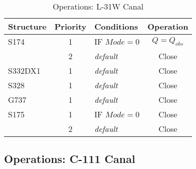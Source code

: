 \scriptsize
\begin{table}[!h]
\centering
\caption{Operations: L-31W Canal}
\label{tab:M11opsL31W}
\begin{tabular}{|l|c|l|c|c|}
\hline
\textbf{Structure} & \textbf{Priority}  & \textbf{Conditions} & \multicolumn{2}{|c|}{\textbf{Operation}}   \\
\hline
\hline
S174          &  1  & IF $Mode=0$                   & \multicolumn{2}{|c|}{$Q = Q_{obs}$}   \\
\hline
              &  2  & \it{default}                  & \multicolumn{2}{|c|}{Close}           \\
\hline
\hline
S332DX1       &  1  & \it{default}                  & \multicolumn{2}{|c|}{Close}           \\
\hline
\hline
S328          &  1  & \it{default}                  & \multicolumn{2}{|c|}{Close}           \\
\hline
\hline
G737          &  1  & \it{default}                  & \multicolumn{2}{|c|}{Close}           \\
\hline
\hline
S175          &  1  & IF $Mode=0$                   & \multicolumn{2}{|c|}{Close}           \\
\hline
              &  2  & \it{default}                  & \multicolumn{2}{|c|}{Close}           \\
\hline
\hline
\end{tabular}
\end{table}
\normalsize

\clearpage

\subsection{Operations: C-111 Canal}

